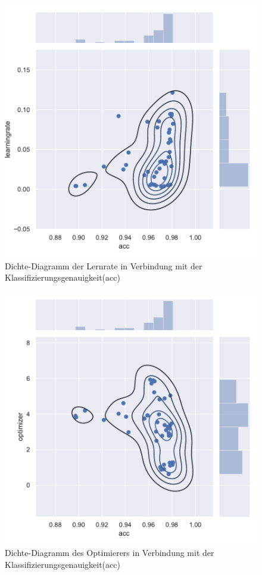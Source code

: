 \begin{figure}[H]
  \centering  
  \includegraphics[scale=0.5]{anhang/GA_250_mnist_digits_False_big_jointplot_learningrate.pdf}
  \caption{Dichte-Diagramm der Lernrate in Verbindung mit der Klassifizierungsgenauigkeit(acc)}
  
\end{figure}

\begin{figure}[H]
  \centering  
  \includegraphics[scale=0.5]{anhang/GA_250_mnist_digits_False_big_jointplot_optimizer.pdf}
  \caption{Dichte-Diagramm des Optimierers in Verbindung mit der Klassifizierungsgenauigkeit(acc)}
  
\end{figure}

